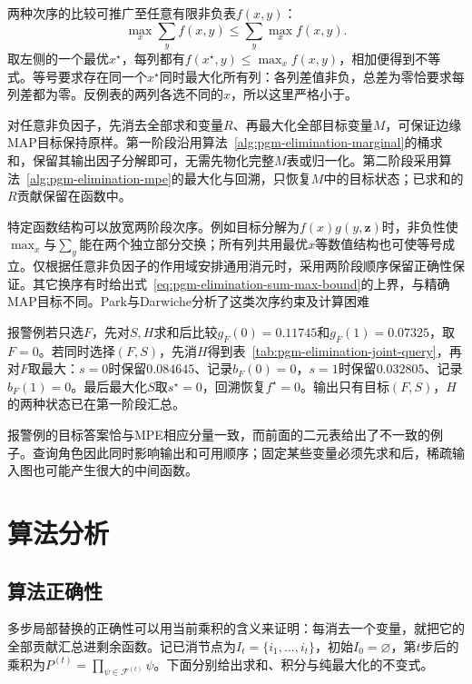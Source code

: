 两种次序的比较可推广至任意有限非负表$f(x,y)$：
\begin{equation}
  \max_x\sum_y f(x,y)
  \leq \sum_y\max_x f(x,y).
  \label{eq:pgm-elimination-sum-max-bound}
\end{equation}
取左侧的一个最优$x^\star$，每列都有$f(x^\star,y)\leq\max_x f(x,y)$，相加便得到不等式。等号要求存在同一个$x^\star$同时最大化所有列：各列差值非负，总差为零恰要求每列差都为零。反例表的两列各选不同的$x$，所以这里严格小于。

对任意非负因子，先消去全部求和变量$R$、再最大化全部目标变量$M$，可保证边缘MAP目标保持原样。第一阶段沿用算法~\ref{alg:pgm-elimination-marginal}的桶求和，保留其输出因子分解即可，无需先物化完整$M$表或归一化。第二阶段采用算法~\ref{alg:pgm-elimination-mpe}的最大化与回溯，只恢复$M$中的目标状态；已求和的$R$贡献保留在函数中。

特定函数结构可以放宽两阶段次序。例如目标分解为$f(x)g(y,\bm{z})$时，非负性使$\max_x$与$\sum_y$能在两个独立部分交换；所有列共用最优$x$等数值结构也可使等号成立。仅根据任意非负因子的作用域安排通用消元时，采用两阶段顺序保留正确性保证。其它换序有时给出式~\eqref{eq:pgm-elimination-sum-max-bound}的上界，与精确MAP目标不同。Park与Darwiche分析了这类次序约束及计算困难

报警例若只选$F$，先对$S,H$求和后比较$g_F(0)=0.11745$和$g_F(1)=0.07325$，取$F=0$。若同时选择$(F,S)$，先消$H$得到表~\ref{tab:pgm-elimination-joint-query}，再对$F$取最大：$s=0$时保留$0.084645$、记录$b_F(0)=0$，$s=1$时保留$0.032805$、记录$b_F(1)=0$。最后最大化$S$取$s^\star=0$，回溯恢复$f^\star=0$。输出只有目标$(F,S)$，$H$的两种状态已在第一阶段汇总。

报警例的目标答案恰与MPE相应分量一致，而前面的二元表给出了不一致的例子。查询角色因此同时影响输出和可用顺序；固定某些变量必须先求和后，稀疏输入图也可能产生很大的中间函数。

\section{算法分析}
\label{sec:pgm-elimination-analysis}

\subsection{算法正确性}
\label{sec:pgm-elimination-correctness}

多步局部替换的正确性可以用当前乘积的含义来证明：每消去一个变量，就把它的全部贡献汇总进剩余函数。记已消节点为$I_t=\{i_1,\ldots,i_t\}$，初始$I_0=\varnothing$，第$t$步后的乘积为$P^{(t)}=\prod_{\psi\in\mathcal{F}^{(t)}}\psi$。下面分别给出求和、积分与纯最大化的不变式。

